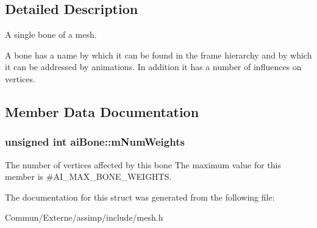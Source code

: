 \subsection{Detailed Description}
A single bone of a mesh. 

A bone has a name by which it can be found in the frame hierarchy and by which it can be addressed by animations. In addition it has a number of influences on vertices. 

\subsection{Member Data Documentation}
\subsubsection[{\texorpdfstring{m\+Num\+Weights}{mNumWeights}}]{\setlength{\rightskip}{0pt plus 5cm}unsigned int ai\+Bone\+::m\+Num\+Weights}\hypertarget{structai_bone_a87a79d42a0132753aac66397ad6f9b71}{}\label{structai_bone_a87a79d42a0132753aac66397ad6f9b71}
The number of vertices affected by this bone The maximum value for this member is \#\+A\+I\+\_\+\+M\+A\+X\+\_\+\+B\+O\+N\+E\+\_\+\+W\+E\+I\+G\+H\+TS. 

The documentation for this struct was generated from the following file\+:\begin{DoxyCompactItemize}
\item 
Commun/\+Externe/assimp/include/mesh.\+h\end{DoxyCompactItemize}
